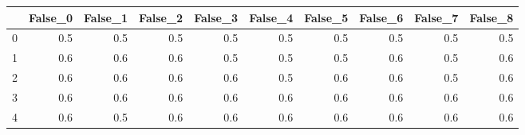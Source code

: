 \begin{tabular}{lrrrrrrrrr}
\toprule
{} &  False\_0 &  False\_1 &  False\_2 &  False\_3 &  False\_4 &  False\_5 &  False\_6 &  False\_7 &  False\_8 \\ \hline
\midrule
0 &      0.5 &      0.5 &      0.5 &      0.5 &      0.5 &      0.5 &      0.5 &      0.5 &      0.5 \\ \hline
1 &      0.6 &      0.6 &      0.6 &      0.5 &      0.5 &      0.5 &      0.6 &      0.5 &      0.6 \\ \hline
2 &      0.6 &      0.6 &      0.6 &      0.6 &      0.5 &      0.6 &      0.6 &      0.5 &      0.6 \\ \hline
3 &      0.6 &      0.6 &      0.6 &      0.6 &      0.6 &      0.6 &      0.6 &      0.6 &      0.6 \\ \hline
4 &      0.6 &      0.5 &      0.6 &      0.6 &      0.6 &      0.6 &      0.6 &      0.6 &      0.6 \\ \hline
\bottomrule
\end{tabular}
